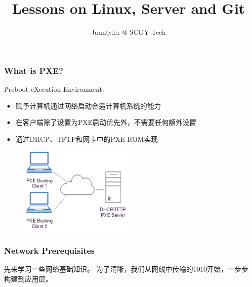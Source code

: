 \documentclass[11pt]{beamer}
\author{Jauntyliu @ SCGY-Tech}
\title{Lessons on Linux, Server and Git}
\begin{document}
\begin{frame}
\titlepage
\end{frame}


\begin{frame}
\frametitle{What is PXE?}

Preboot eXecution Environment:
\begin{itemize}
\item 赋予计算机通过网络启动合适计算机系统的能力
\item 在客户端除了设置为PXE启动优先外，不需要任何额外设置
\item 通过DHCP、TFTP和网卡中的PXE ROM实现
\end{itemize}
\begin{figure}
\includegraphics[width=0.5\textwidth]{290px-PXE_diagram.png}
\end{figure}
\end{frame}


\begin{frame}
\frametitle{Network Prerequisites}
先来学习一些网络基础知识。
为了清晰，我们从网线中传输的1010开始，一步步构建到应用层。
\end{frame}
\end{document}
